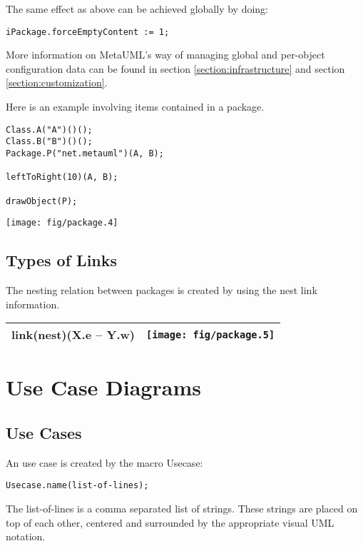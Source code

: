 \documentclass{article}
\newcommand{\code}{\ttfamily}
\begin{document}
The same effect as above can be achieved globally by doing:

\begin{verbatim}
iPackage.forceEmptyContent := 1;
\end{verbatim}

More information on MetaUML's way of managing global and per-object configuration data can be found in section \ref{section:infrastructure} and section \ref{section:customization}.

Here is an example involving items contained in a package.

\begin{multicols}{2}
\begin{verbatim}
Class.A("A")()();
Class.B("B")()();
Package.P("net.metauml")(A, B);

leftToRight(10)(A, B);

drawObject(P);
\end{verbatim}
\columnbreak
\hspace{3cm}\texttt{[image: fig/package.4]}
\end{multicols}

\subsection{Types of Links}

The nesting relation between packages is created by using the {\code nest} link information.

\begin{tabular}{||l|c||}
\hline
{\code link(nest)(X.e -- Y.w)} & \texttt{[image: fig/package.5]} \\
\hline
\end{tabular}

\section{Use Case Diagrams}

\subsection{Use Cases}
An use case is created by the macro {\code Usecase}:

\begin{verbatim}
Usecase.name(list-of-lines);
\end{verbatim}

The {\code list-of-lines} is a comma separated list of strings. These strings are placed
on top of each other, centered and surrounded by the appropriate visual UML notation.
\end{document}
